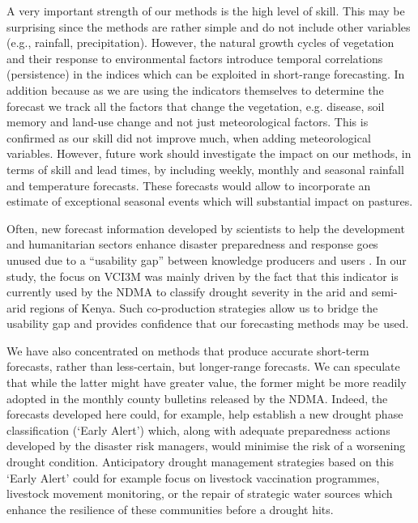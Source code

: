 \documentclass[review]{elsarticle}
\begin{document}
A very important strength of our methods is the high level of skill. This may be surprising since the methods are rather simple and do not include other variables (e.g., rainfall, precipitation). \label{review:correlation}
However, the natural growth cycles of vegetation and their response to environmental factors introduce temporal correlations (persistence) in the indices which can be exploited in short-range forecasting. In addition because as we are using the indicators themselves to determine the forecast we track all the factors that change the vegetation, e.g. disease, soil memory and land-use change and not just meteorological factors. This is confirmed as our skill did not improve much, when adding meteorological variables. However, future work should investigate the impact on our methods, in terms of skill and lead times, by including weekly, monthly and seasonal rainfall and temperature forecasts. These forecasts would allow to incorporate an estimate of exceptional seasonal events which will substantial impact on pastures.

Often, new forecast information developed by scientists to help the development and humanitarian sectors enhance disaster preparedness and response goes unused due to a ``usability gap'' between knowledge producers and users \citep{lemos2012narrowing}. In our study, the focus on VCI3M was mainly driven by the fact that this indicator is currently used by the NDMA to classify drought severity in the arid and semi-arid regions of Kenya. Such co-production strategies allow us to bridge the usability gap \citep{dilling2011creating,lemos2018naturesus} and provides confidence that our forecasting methods may be used.

We have also concentrated on methods that produce accurate short-term forecasts, rather than less-certain, but longer-range forecasts. We can speculate that while the latter might have greater value, the former might be more readily adopted in the monthly county bulletins released by the NDMA. Indeed, the forecasts developed here could, for example, help establish a new drought phase classification (`Early Alert') which, along with adequate preparedness actions developed by the disaster risk managers, would minimise the risk of a worsening drought condition. Anticipatory drought management strategies based on this `Early Alert' could for example focus on livestock vaccination programmes, livestock movement monitoring, or the repair of strategic water sources which enhance the resilience of these communities before a drought hits.
\end{document}
